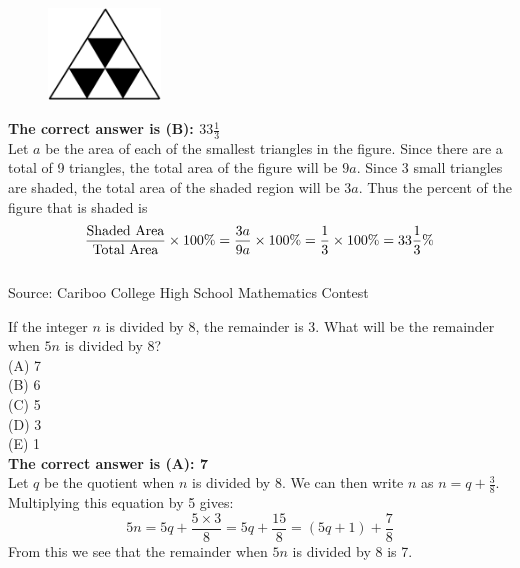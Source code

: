 \documentclass{article}
\begin{document}
\begin{figure}
	\includegraphics[width=30mm,viewport=33 187 502 584]{CCJPR73-10pic.eps}
\end{figure}

\textbf{The correct answer is (B): $33\frac{1}{3}$}\\[1 ex]
Let $a$ be the area of each of the smallest triangles in the figure. Since there are a total of 9 triangles, the total area of the figure will be $9a$.  Since 3 small triangles are shaded, the total area of the shaded region will be $3a$. Thus the percent of the figure that is shaded is
\begin{equation*}
\frac{\textrm{Shaded\space Area}}{\textrm{Total\space Area}}\times100\%=\frac{3a}{9a}\times100\%=\frac{1}{3}\times100\%=33\frac{1}{3}\%
\end{equation*}
\\[5 ex]

\scriptsize
Source: Cariboo College High School Mathematics Contest

\normalsize
If the integer $n$ is divided by 8, the remainder is 3.  What will be the remainder when $5n$ is divided by 8?\\
(A) 7\\
(B) 6\\
(C) 5\\
(D) 3\\
(E) 1\\


\textbf{The correct answer is (A): 7}\\[1 ex]
Let $q$ be the quotient when $n$ is divided by 8. We can then write $n$ as $n=q+\frac{3}{8}$. Multiplying this equation by 5 gives:
\begin{equation*}
5n=5q+\frac{5\times3}{8}=5q+\frac{15}{8}= (5q+1)+\frac{7}{8}
\end{equation*}
From this we see that the remainder when $5n$ is divided by 8 is 7.
\\[5 ex]
\end{document}
